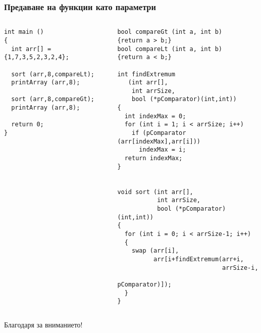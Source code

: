 \documentclass{beamer}
\begin{document}
\begin{frame}[fragile]
\frametitle{Предаване на функции като параметри}



\vspace{-20px}

\begin{columns}[t]
  \begin{column}{0.5\textwidth}
\begin{flushleft}
\begin{lstlisting}
int main ()
{
  int arr[] = {1,7,3,5,2,3,2,4};

  sort (arr,8,compareLt);
  printArray (arr,8);

  sort (arr,8,compareGt);
  printArray (arr,8);

  return 0;
}
\end{lstlisting}  
\end{flushleft}
  \end{column}
  \begin{column}{0.5\textwidth}
\begin{flushleft}
\begin{lstlisting}
bool compareGt (int a, int b)
{return a > b;}
bool compareLt (int a, int b)
{return a < b;}

int findExtremum 
   (int arr[], 
    int arrSize, 
    bool (*pComparator)(int,int))
{
  int indexMax = 0;
  for (int i = 1; i < arrSize; i++)
    if (pComparator (arr[indexMax],arr[i]))
      indexMax = i;
  return indexMax;
}


void sort (int arr[], 
           int arrSize,
           bool (*pComparator)(int,int))
{
  for (int i = 0; i < arrSize-1; i++)
  {
    swap (arr[i],
          arr[i+findExtremum(arr+i,
                             arrSize-i,
                             pComparator)]);
  }
}
\end{lstlisting}  
\end{flushleft}
  \end{column}
\end{columns}


\end{frame}








\begin{frame}
\centerline{Благодаря за вниманието!}
\end{frame}
\end{document}
